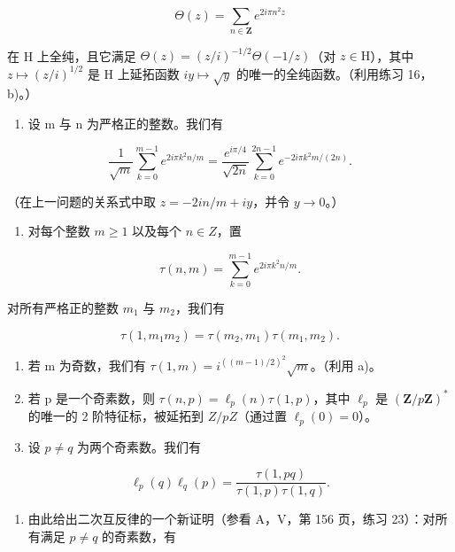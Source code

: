 \[
\Theta (z) = \sum_ {n \in \mathbf {Z}} e ^ {2 i \pi n ^ {2} z}
\]

在 H 上全纯，且它满足 \(\Theta(z) = (z/i)^{-1/2}\Theta(-1/z)\)（对 \(z\in\mathrm{H}\)），其中 \(z\mapsto(z/i)^{1/2}\) 是 H 上延拓函数 \(iy\mapsto\sqrt{y}\) 的唯一的全纯函数。（利用练习 16，b)。）

\begin{enumerate}
\def\labelenumi{\alph{enumi})}
\setcounter{enumi}{1}
\tightlist
\item
  设 m 与 n 为严格正的整数。我们有
\end{enumerate}

\[
\frac {1}{\sqrt {m}} \sum_ {k = 0} ^ {m - 1} e ^ {2 i \pi k ^ {2} n / m} = \frac {e ^ {i \pi / 4}}{\sqrt {2 n}} \sum_ {k = 0} ^ {2 n - 1} e ^ {- 2 i \pi k ^ {2} m / (2 n)}.
\]

（在上一问题的关系式中取 \(z = -2in / m + iy\)，并令 \(y \to 0\)。）

\begin{enumerate}
\def\labelenumi{\alph{enumi})}
\setcounter{enumi}{2}
\tightlist
\item
  对每个整数 \(m \geqslant 1\) 以及每个 \(n \in Z\)，置
\end{enumerate}

\[
\tau (n, m) = \sum_ {k = 0} ^ {m - 1} e ^ {2 i \pi k ^ {2} n / m}.
\]

对所有严格正的整数 \(m_{1}\) 与 \(m_{2}\)，我们有

\[
\tau (1, m _ {1} m _ {2}) = \tau (m _ {2}, m _ {1}) \tau (m _ {1}, m _ {2}).
\]

\begin{enumerate}
\def\labelenumi{\alph{enumi})}
\setcounter{enumi}{3}
\item
  若 m 为奇数，我们有 \(\tau(1,m)=i^{((m-1)/2)^{2}}\sqrt{m}\)。（利用 a)。
\item
  若 p 是一个奇素数，则 \(\tau(n,p)=\ell_{p}(n)\tau(1,p)\)，其中 \(\ell_{p}\) 是 \((\mathbf{Z}/p\mathbf{Z})^{*}\) 的唯一的 2 阶特征标，被延拓到 \(Z/pZ\)（通过置 \(\ell_{p}(0)=0\)）。
\item
  设 \(p \neq q\) 为两个奇素数。我们有
\end{enumerate}

\[
\ell_ {p} (q) \ell_ {q} (p) = \frac {\tau (1 , p q)}{\tau (1 , p) \tau (1 , q)}.
\]

\begin{enumerate}
\def\labelenumi{\alph{enumi})}
\setcounter{enumi}{6}
\tightlist
\item
  由此给出二次互反律的一个新证明（参看 A，V，第 156 页，练习 23）：对所有满足 \(p \neq q\) 的奇素数，有
\end{enumerate}

